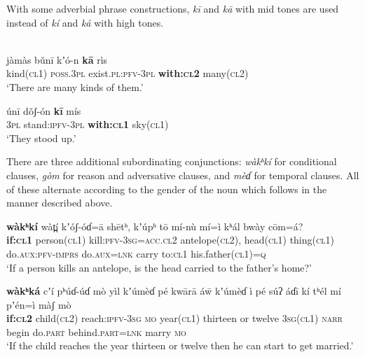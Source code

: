 \documentclass[output=collectionpaper,hidelinks]{langscibook}
\theoremstyle{remark}
\begin{document}
With some adverbial phrase constructions, \emph{kī} and \emph{kā} with mid tones are used instead of \emph{kí} and \emph{ká} with high tones.\nocite{d:BeamCridland:Uduk}

\ea
\citep{d:BeamCridland:Uduk}\\
\gll  jàmàs bǔnī kʼó-n \textbf{kā} rìs \\
 kind(\textsc{cl1}) \textsc{poss.3pl} exist.\textsc{pl}:\textsc{pfv}-\textsc{3pl} \textbf{with:\textsc{cl2}} many(\textsc{cl2}) \\
\glt `There are many kinds of them.' \\
\z

\ea
\gll  únī dǒʃ-ón \textbf{kī} mís \\
 \textsc{3pl} stand:\textsc{ipfv}-\textsc{3pl} \textbf{with:\textsc{cl1}} sky(\textsc{cl1}) \\
\glt `They stood up.' \\
\z

There are three additional subordinating conjunctions: \emph{wàkʰkí} for
conditional clauses, \emph{gòm} for reason and adversative clauses, and
\emph{mèɗ} for temporal clauses. All of these alternate according to the
gender of the noun which follows in the manner described above.

\ea
\gll  \textbf{wàkʰkí} wàt̪í kʼóʃ-óɗ=ā shētʰ, kʼúpʰ tō mí-nù mí=ì kʰál bwày cōm=á? \\
 \textbf{if:\textsc{cl1}} person(\textsc{cl1}) kill:\textsc{pfv}-\textsc{3sg}=\textsc{acc.cl2} antelope(\textsc{cl2}), head(\textsc{cl1}) thing(\textsc{cl1}) do.\textsc{aux}:\textsc{pfv}-\textsc{imprs} do.\textsc{aux}=\textsc{lnk} carry to:\textsc{cl1} his.father(\textsc{cl1})=\textsc{q} \\
\glt `If a person kills an antelope, is the head carried to the father's home?' \\
\z

\ea
\label{ex:Don:reach-year}
\gll \textbf{wàkʰká} cʼí pʰúɗ-úɗ mò yìl {kʼúmèɗ pé kwārā} áw̄ {kʼúmèɗ ì pé súʔ} áɗī kí tʰél mí pʼén=ì màʃ mò\\
 \textbf{if:\textsc{cl2}} child(\textsc{cl2}) reach:\textsc{ipfv}-\textsc{3sg} \textsc{mo} year(\textsc{cl1}) thirteen or twelve \textsc{3sg}(\textsc{cl1}) \textsc{narr} begin do.\textsc{part} behind.\textsc{part}=\textsc{lnk} marry \textsc{mo}\\
\glt `If the child reaches the year thirteen or twelve then he can start to get married.' \\
\z
\end{document}
